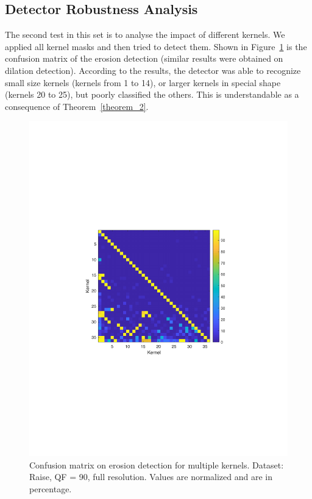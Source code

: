 \documentclass{ieeeaccess}
\begin{document}
\subsection{Detector Robustness Analysis}
\label{subsec:result_attacks}

The second test in this set is to analyse the impact of different kernels. We applied all kernel masks and then tried to detect them. Shown in Figure~\ref{fig:confusion} is the confusion matrix of the erosion detection (similar results were obtained on dilation detection). According to the results, the detector was able to recognize small size kernels (kernels from 1 to 14), or larger kernels in special shape (kernels 20 to 25), but poorly classified the others. This is understandable as a consequence of Theorem~\ref{theorem_2}.

\begin{figure}[b!]
	\centering
	\includegraphics[width=\linewidth]{confusion_matrix}
	\caption{Confusion matrix on erosion detection for multiple kernels. Dataset: Raise, QF = 90, full resolution. Values are normalized and are in percentage.}
	\label{fig:confusion}
\end{figure}
\end{document}
